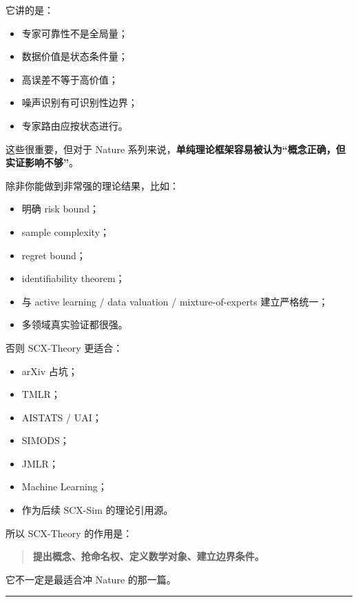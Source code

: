 \documentclass[
  12pt,
]{ctexart}
\providecommand{\tightlist}{%
  \setlength{\itemsep}{0pt}\setlength{\parskip}{0pt}}
\begin{document}
它讲的是：

\begin{itemize}
\tightlist
\item
  专家可靠性不是全局量；
\item
  数据价值是状态条件量；
\item
  高误差不等于高价值；
\item
  噪声识别有可识别性边界；
\item
  专家路由应按状态进行。
\end{itemize}

这些很重要，但对于 Nature
系列来说，\textbf{单纯理论框架容易被认为``概念正确，但实证影响不够''}。

除非你能做到非常强的理论结果，比如：

\begin{itemize}
\tightlist
\item
  明确 risk bound；
\item
  sample complexity；
\item
  regret bound；
\item
  identifiability theorem；
\item
  与 active learning / data valuation / mixture-of-experts
  建立严格统一；
\item
  多领域真实验证都很强。
\end{itemize}

否则 SCX-Theory 更适合：

\begin{itemize}
\tightlist
\item
  arXiv 占坑；
\item
  TMLR；
\item
  AISTATS / UAI；
\item
  SIMODS；
\item
  JMLR；
\item
  Machine Learning；
\item
  作为后续 SCX-Sim 的理论引用源。
\end{itemize}

所以 SCX-Theory 的作用是：

\begin{quote}
\textbf{提出概念、抢命名权、定义数学对象、建立边界条件。}
\end{quote}

它不一定是最适合冲 Nature 的那一篇。

\begin{center}\rule{0.5\linewidth}{0.5pt}\end{center}
\end{document}
